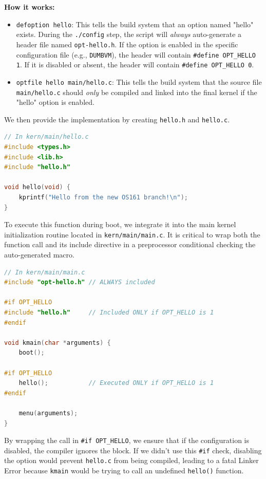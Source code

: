 \textbf{How it works:}
\begin{itemize}
    \item \texttt{defoption hello}: This tells the build system that an option named "hello" exists. During the \texttt{./config} step, the script will \textit{always} auto-generate a header file named \texttt{opt-hello.h}. If the option is enabled in the specific configuration file (e.g., \texttt{DUMBVM}), the header will contain \texttt{\#define OPT\_HELLO 1}. If it is disabled or absent, the header will contain \texttt{\#define OPT\_HELLO 0}.
    \item \texttt{optfile hello main/hello.c}: This tells the build system that the source file \texttt{main/hello.c} should \textit{only} be compiled and linked into the final kernel if the "hello" option is enabled.
\end{itemize}

We then provide the implementation by creating \texttt{hello.h} and \texttt{hello.c}.
\begin{lstlisting}[language=C]
// In kern/main/hello.c
#include <types.h>
#include <lib.h>
#include "hello.h"

void hello(void) {
    kprintf("Hello from the new OS161 branch!\n");
}
\end{lstlisting}

To execute this function during boot, we integrate it into the main kernel initialization routine located in \texttt{kern/main/main.c}. It is critical to wrap both the function call and its include directive in a preprocessor conditional checking the auto-generated macro.

\begin{lstlisting}[language=C]
// In kern/main/main.c
#include "opt-hello.h" // ALWAYS included

#if OPT_HELLO
#include "hello.h"     // Included ONLY if OPT_HELLO is 1
#endif

void kmain(char *arguments) {
    boot();
    
#if OPT_HELLO
    hello();           // Executed ONLY if OPT_HELLO is 1
#endif
    
    menu(arguments);
}
\end{lstlisting}

By wrapping the call in \texttt{\#if OPT\_HELLO}, we ensure that if the configuration is disabled, the compiler ignores the block. If we didn't use this \texttt{\#if} check, disabling the option would prevent \texttt{hello.c} from being compiled, leading to a fatal Linker Error because \texttt{kmain} would be trying to call an undefined \texttt{hello()} function.

